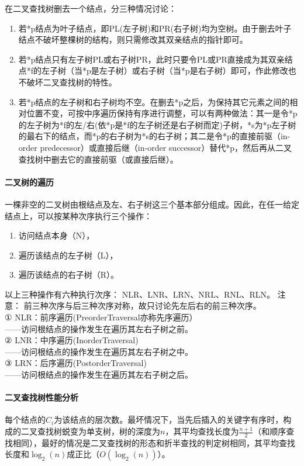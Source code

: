 \documentclass[a4paper]{article}
\begin{document}
\begin{CJK}{UTF8}{gbsn}
在二叉查找树删去一个结点，分三种情况讨论：
\begin{enumerate}
\item 若*p结点为叶子结点，即PL(左子树)和PR(右子树)均为空树。由于删去叶子结点不破坏整棵树的结构，则只需修改其双亲结点的指针即可。
\item 若*p结点只有左子树PL或右子树PR，此时只要令PL或PR直接成为其双亲结点*f的左子树（当*p是左子树）或右子树（当*p是右子树）即可，作此修改也不破坏二叉查找树的特性。
\item 若*p结点的左子树和右子树均不空。在删去*p之后，为保持其它元素之间的相对位置不变，可按中序遍历保持有序进行调整，可以有两种做法：其一是令*p的左子树为*f的左/右(依*p是*f的左子树还是右子树而定)子树，*s为*p左子树的最右下的结点，而*p的右子树为*s的右子树；其二是令*p的直接前驱（in-order predecessor）或直接后继（in-order successor）替代*p，然后再从二叉查找树中删去它的直接前驱（或直接后继）。
\end{enumerate}

\paragraph{二叉树的遍历} 一棵非空的二叉树由根结点及左、右子树这三个基本部分组成。因此，在任一给定结点上，可以按某种次序执行三个操作：
\begin{enumerate}
\item 访问结点本身（N）， 
\item 遍历该结点的左子树（L）， 
\item 遍历该结点的右子树（R）。
\end{enumerate}

以上三种操作有六种执行次序：
NLR、LNR、LRN、NRL、RNL、RLN。
注意：
前三种次序与后三种次序对称，故只讨论先左后右的前三种次序。\\
① NLR：前序遍历(PreorderTraversal亦称先序遍历）\\
	——访问根结点的操作发生在遍历其左右子树之前。\\
② LNR：中序遍历(InorderTraversal)\\
	——访问根结点的操作发生在遍历其左右子树之中。\\
③ LRN：后序遍历(PostorderTraversal)\\
	——访问根结点的操作发生在遍历其左右子树之后。


\paragraph{二叉查找树性能分析}%
每个结点的$C_i$为该结点的层次数。最坏情况下，当先后插入的关键字有序时，构成的二叉查找树蜕变为单支树，树的深度为$n$，其平均查找长度为$\frac{n+1}{2}$（和顺序查找相同），最好的情况是二叉查找树的形态和折半查找的判定树相同，其平均查找长度和$\log_2(n)$成正比（$O(\log_2(n))$）。


\end{CJK}
\end{document}
